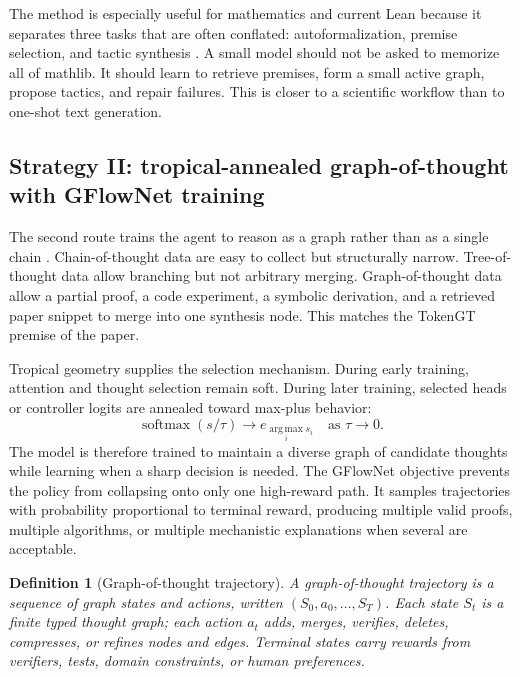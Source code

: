 \documentclass[11pt]{article}
\newtheorem{definition}{Definition}[section]
\newcommand{\softmax}{\operatorname{softmax}}
\newcommand{\argmax}{\operatorname*{arg\,max}}
\newcommand{\1}{\mathbf{1}}
\begin{document}
The method is especially useful for mathematics and current Lean because it separates three tasks that are often conflated: autoformalization, premise selection, and tactic synthesis \cite{Lean4Reference,LeanMathlib,LeanDojoV2}. A small model should not be asked to memorize all of mathlib. It should learn to retrieve premises, form a small active graph, propose tactics, and repair failures. This is closer to a scientific workflow than to one-shot text generation.

\subsection{Strategy II: tropical-annealed graph-of-thought with GFlowNet training}

The second route trains the agent to reason as a graph rather than as a single chain \cite{TreeOfThoughts2023,GraphOfThoughts2023,FlowOfReasoning2024,GFlowMath2025}. Chain-of-thought data are easy to collect but structurally narrow. Tree-of-thought data allow branching but not arbitrary merging. Graph-of-thought data allow a partial proof, a code experiment, a symbolic derivation, and a retrieved paper snippet to merge into one synthesis node. This matches the TokenGT premise of the paper.

Tropical geometry supplies the selection mechanism. During early training, attention and thought selection remain soft. During later training, selected heads or controller logits are annealed toward max-plus behavior:
\[
\softmax(s/\tau)\longrightarrow e_{\argmax_i s_i}\quad \text{as }\tau\to 0.
\]
The model is therefore trained to maintain a diverse graph of candidate thoughts while learning when a sharp decision is needed. The GFlowNet objective prevents the policy from collapsing onto only one high-reward path. It samples trajectories with probability proportional to terminal reward, producing multiple valid proofs, multiple algorithms, or multiple mechanistic explanations when several are acceptable.

\begin{definition}[Graph-of-thought trajectory]
A graph-of-thought trajectory is a sequence of graph states and actions, written $(S_0,a_0,\ldots,S_T)$. Each state $S_t$ is a finite typed thought graph; each action $a_t$ adds, merges, verifies, deletes, compresses, or refines nodes and edges. Terminal states carry rewards from verifiers, tests, domain constraints, or human preferences.
\end{definition}
\end{document}

